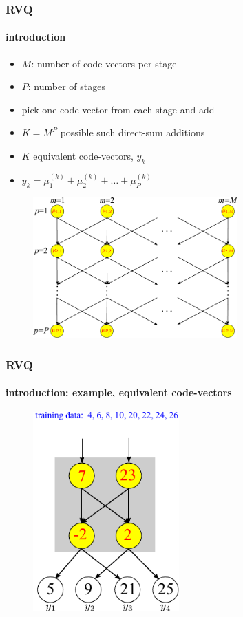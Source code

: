 \begin{frame}
\frametitle{RVQ}
\framesubtitle{introduction}
\logoCSIPCPL\mypagenum
\begin{itemize}
\item $M$: number of code-vectors per stage
\item $P$: number of stages
\item pick one code-vector from each stage and add
\item $K=M^P$ possible such direct-sum additions
\item $K$ equivalent code-vectors, $y_k$
\item $y_k = \mu_1^{(k)} + \mu_2^{(k)} + \ldots + \mu_P^{(k)}$
\end{itemize}
\begin{figure}[t]
\centering
\includegraphics[width=0.7\textwidth]{thesis/RVQ.pdf}
\end{figure}
\end{frame}


\begin{frame}
\frametitle{RVQ}
\framesubtitle{introduction: example, equivalent code-vectors}
\logoCSIPCPL\mypagenum
\begin{figure}[t]
\centering
\includegraphics[width=0.5\textwidth]{thesis/RVQ_introduction.pdf}
\end{figure}
\end{frame}


